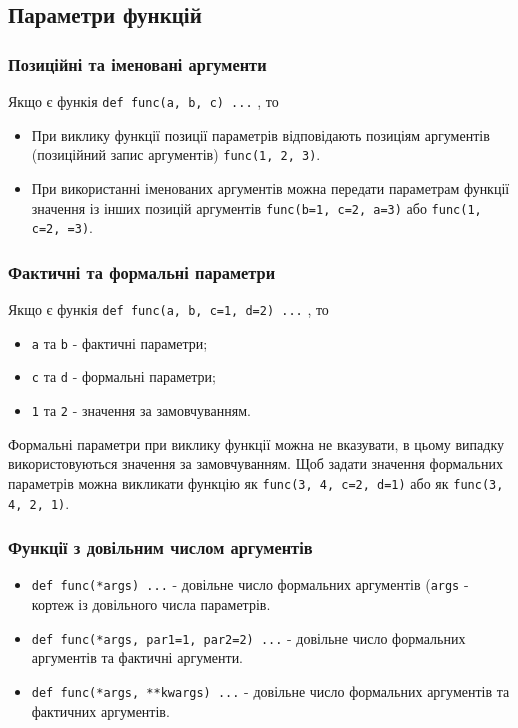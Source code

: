 \subsection{Параметри функцій} 
\begin{frame}
\frametitle{Позиційні та іменовані аргументи}
Якщо є функія \texttt{def func(a, b, c) ...} , то

\begin{itemize}
  \item При виклику функції позиції параметрів відповідають позиціям аргументів (позиційний запис аргументів) \texttt{func(1, 2, 3)}.
  \item При використанні іменованих аргументів можна передати параметрам функції значення із інших позицій аргументів \texttt{func(b=1, c=2, a=3)} або \texttt{func(1, c=2, =3)}.
\end{itemize}

\end{frame}


\begin{frame}
\frametitle{Фактичні та формальні параметри}
Якщо є функія \texttt{def func(a, b, c=1, d=2) ...} , то
\begin{itemize}
  \item \texttt{a} та \texttt{b} - фактичні параметри;
  \item \texttt{c} та \texttt{d} - формальні параметри;
  \item \texttt{1}  та \texttt{2} - значення за замовчуванням. 
\end{itemize}

Формальні параметри при виклику функції можна не вказувати, в цьому випадку використовуються значення за замовчуванням. Щоб задати значення формальних параметрів можна викликати функцію як \texttt{func(3, 4, c=2, d=1)} або як \texttt{func(3, 4, 2, 1)}.


\end{frame}


\begin{frame}
\frametitle{Функції з довільним числом аргументів}
\begin{itemize}
  \item \texttt{def func(*args) ...} - довільне число формальних аргументів (\texttt{args} - кортеж із довільного числа параметрів. 
  \item \texttt{def func(*args, par1=1, par2=2) ...}  - довільне число формальних аргументів та фактичні аргументи.
  \item \texttt{def func(*args, **kwargs) ...} - довільне число формальних аргументів та фактичних аргументів.
\end{itemize}
\end{frame}


